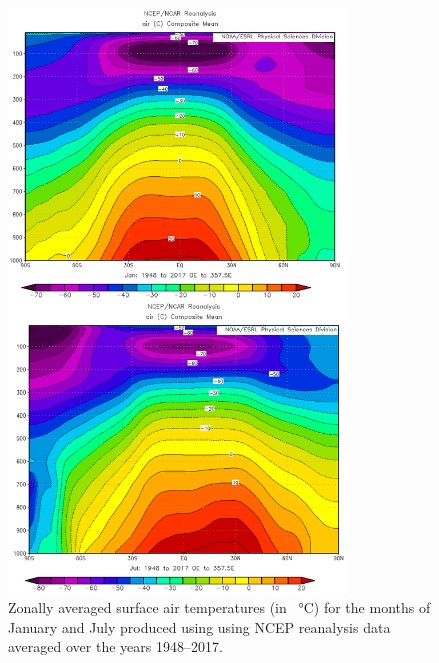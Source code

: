 \documentclass[11pt]{article}
\begin{document}
\begin{figure}[h!]
  \centering
  \includegraphics[width=0.8\textwidth]{airT_janjul.png}
  \caption{Zonally averaged surface air temperatures (in \SI{}{\degreeCelsius}) for the months of January and July produced using using NCEP reanalysis data averaged over the years 1948--2017.}
  \label{fig:airT}
\end{figure}
\end{document}
